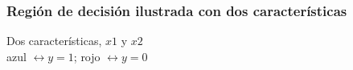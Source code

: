 \documentclass{beamer}
\begin{document}
 \begin{frame}\frametitle{Región de decisión ilustrada con dos características}
          \begin{minipage}[t][5cm][t]{5.5cm}
          \end{minipage}
       \begin{minipage}[t][5cm][t]{4.5cm}
         \footnotesize
     Dos características, $x1$ y $x2$\\
     azul $\leftrightarrow y=1$; rojo $\leftrightarrow y=0$
     \end{minipage}\\

 \end{frame}
\end{document}
